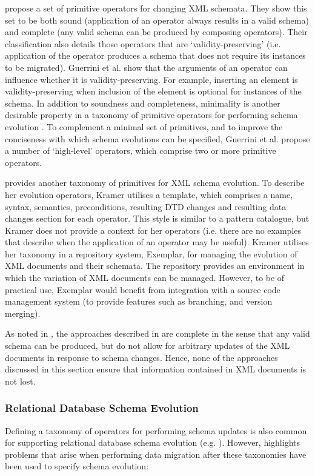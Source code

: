 \cite{guerrini05impact} propose a set of primitive operators for changing XML schemata. They show this set to be both sound (application of an operator always results in a valid schema) and complete (any valid schema can be produced by composing operators). Their classification also details those operators that are `validity-preserving' (i.e. application of the operator produces a schema that does not require its instances to be migrated). Guerrini et al. show that the arguments of an operator can influence whether it is validity-preserving. For example, inserting an element is validity-preserving when inclusion of the element is optional for instances of the schema. In addition to soundness and completeness, minimality is another desirable property in a taxonomy of primitive operators for performing schema evolution \cite{su01xem}. To complement a minimal set of primitives, and to improve the conciseness with which schema evolutions can be specified, Guerrini et al. propose a number of `high-level' operators, which comprise two or more primitive operators.

\cite{kramer01xem} provides another taxonomy of primitives for XML schema evolution. To describe her evolution operators, Kramer utilises a template, which comprises a name, syntax, semantics, preconditions, resulting DTD changes and resulting data changes section for each operator. This style is similar to a pattern catalogue, but Kramer does not provide a context for her operators (i.e. there are no examples that describe when the application of an operator may be useful). Kramer utilises her taxonomy in a repository system, Exemplar, for managing the evolution of XML documents and their schemata. The repository provides an environment in which the variation of XML documents can be managed. However, to be of practical use, Exemplar would benefit from integration with a source code management system (to provide features such as branching, and version merging).

As noted in \cite{pizka07automating}, the approaches described in \cite{kramer01xem,su01xem,guerrini05impact} are complete in the sense that any valid schema can be produced, but do not allow for arbitrary updates of the XML documents in response to schema changes. Hence, none of the approaches discussed in this section ensure that information contained in XML documents is not lost.


\subsubsection{Relational Database Schema Evolution}
\label{LitReview:RdbsSchemaEvo}
Defining a taxonomy of operators for performing schema updates is also common for supporting relational database schema evolution (e.g. \cite{edelweiss05temporal,banerjee87semantics}). However, \cite{lerner00model} highlights problems that arise when performing data migration after these taxonomies have been used to specify schema evolution:

